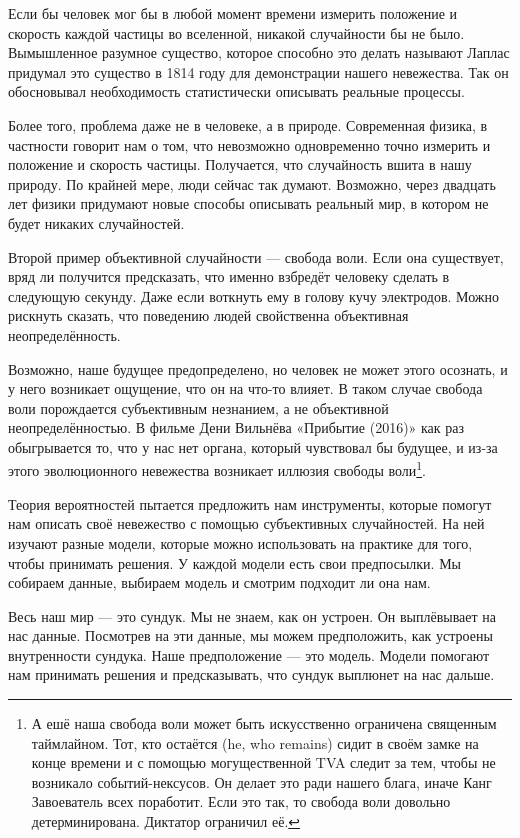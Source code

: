\documentclass[12pt, a4paper, oneside]{article}
\begin{document}
Если бы человек мог бы в любой момент времени измерить положение и скорость каждой частицы во вселенной, никакой случайности бы не было. Вымышленное разумное существо, которое способно это делать называют  Лаплас придумал это существо в 1814 году для демонстрации нашего невежества. Так он обосновывал необходимость статистически описывать реальные процессы. 

Более того, проблема даже не в человеке, а в природе. Современная физика, в частности  говорит нам о том, что невозможно одновременно точно измерить и положение и скорость частицы. Получается, что случайность вшита в нашу природу. По крайней мере, люди сейчас так думают. Возможно, через двадцать лет физики придумают новые способы описывать реальный мир, в котором не будет никаких случайностей. 

Второй пример объективной случайности --- свобода воли. Если она существует, вряд ли получится предсказать, что именно взбредёт человеку сделать в следующую секунду. Даже если воткнуть ему в голову кучу электродов. Можно рискнуть сказать, что поведению людей свойственна объективная неопределённость.

Возможно, наше будущее предопределено, но человек не может этого осознать, и у него возникает ощущение, что он на что-то влияет. В таком случае свобода воли порождается субъективным незнанием, а не объективной неопределённостью. В фильме Дени Вильнёва «Прибытие (2016)» как раз обыгрывается то, что у нас нет органа, который чувствовал бы будущее, и из-за этого эволюционного невежества возникает иллюзия свободы воли\footnote{А ешё наша свобода воли может быть искусственно ограничена священным таймлайном. Тот, кто остаётся (he, who remains) сидит в своём замке на конце времени и с помощью могущественной TVA следит за тем, чтобы не возникало событий-нексусов. Он делает это ради нашего блага, иначе Канг Завоеватель всех поработит. Если это так, то свобода воли довольно детерминирована. Диктатор ограничил её.}.

Теория вероятностей пытается предложить нам инструменты, которые помогут нам описать своё невежество с помощью субъективных случайностей. На ней изучают разные модели, которые можно использовать на практике для того, чтобы принимать решения. У каждой модели есть свои предпосылки. Мы собираем данные, выбираем модель и смотрим подходит ли она нам. 

Весь наш мир --- это сундук. Мы не знаем, как он устроен. Он выплёвывает на нас данные. Посмотрев на эти данные, мы можем предположить, как устроены внутренности сундука. Наше предположение --- это модель. Модели помогают нам принимать решения и предсказывать, что сундук выплюнет на нас дальше.
\end{document}

